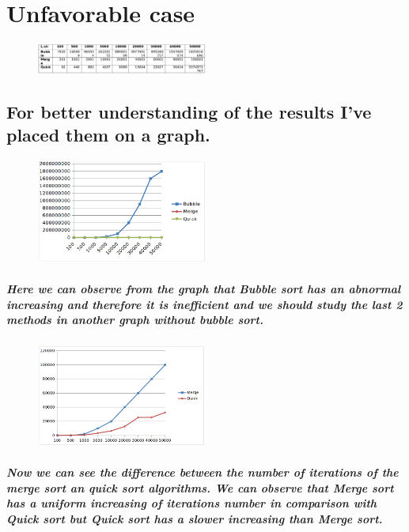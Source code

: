\documentclass[12pt]{article}
\begin{document}
\newpage
\section{Unfavorable case}

\begin{figure}[h!]
  \centering
    {%
      \includegraphics[width=0.5\textwidth]{7}}
\end{figure}

\subsection*{
For better understanding of the results I've placed them on a graph.
}

\begin{figure}[h!]
  \centering
    {%
      \includegraphics[width=0.5\textwidth]{8}}
\end{figure}

\subparagraph*{
Here we can observe from the graph that Bubble sort has an abnormal increasing and therefore it is inefficient and we should study the last 2 methods in another graph without bubble sort. 
}

\newpage
\begin{figure}[h!]
  \centering
    {%
      \includegraphics[width=0.5\textwidth]{4}}
\end{figure}

\subparagraph*{Now we can see the difference between the number of iterations of the merge sort an quick sort algorithms. We can observe that Merge sort has a uniform increasing of iterations number in comparison with Quick sort but Quick sort has a slower increasing than Merge sort.}
\end{document}
